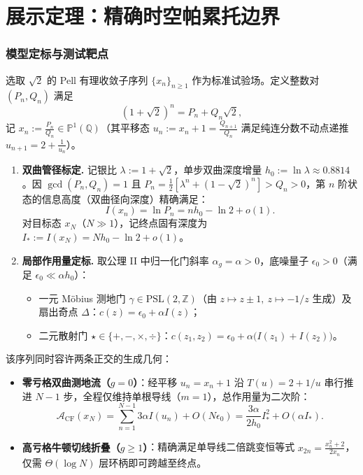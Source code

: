 \documentclass[11pt,a4paper]{ctexart}
\theoremstyle{plain}
\theoremstyle{definition}
\newcommand{\PP}{\mathbb{P}}
\newcommand{\QQ}{\mathbb{Q}}
\newcommand{\ZZ}{\mathbb{Z}}
\newcommand{\cA}{\mathcal{A}}
\newcommand{\PSL}{\mathrm{PSL}}
\begin{document}
\part{展示定理：精确时空帕累托边界}

\section{模型定标与测试靶点}

选取 $\sqrt{2}$ 的 Pell 有理收敛子序列 $\{x_n\}_{n \ge 1}$ 作为标准试验场。定义整数对 $(P_n, Q_n)$ 满足
\[
(1 + \sqrt{2})^n = P_n + Q_n\sqrt{2},
\]
记 $x_n := \frac{P_n}{Q_n} \in \PP^1(\QQ)$（其平移态 $u_n := x_n + 1 = \frac{Q_{n+1}}{Q_n}$ 满足纯连分数不动点递推 $u_{n+1} = 2 + \frac{1}{u_n}$）。

\begin{enumerate}
\item \textbf{双曲管径标定.} 记银比 $\lambda := 1 + \sqrt{2}$，单步双曲深度增量 $h_0 := \ln \lambda \approx 0.8814$。因 $\gcd(P_n, Q_n) = 1$ 且 $P_n = \frac{1}{2}[\lambda^n + (1-\sqrt{2})^n] > Q_n > 0$，第 $n$ 阶状态的信息高度（双曲径向深度）精确满足：
\[
I(x_n) = \ln P_n = n h_0 - \ln 2 + o(1).
\]
对目标态 $x_N$（$N \gg 1$），记终点固有深度为 $I_* := I(x_N) = N h_0 - \ln 2 + o(1)$。

\item \textbf{局部作用量定标.} 取公理 II 中归一化门斜率 $\alpha_g = \alpha > 0$，底噪量子 $\epsilon_0 > 0$（满足 $\epsilon_0 \ll \alpha h_0$）：
\begin{itemize}
\item 一元 Möbius 测地门 $\gamma \in \PSL(2, \ZZ)$（由 $z \mapsto z \pm 1,\ z \mapsto -1/z$ 生成）及扇出奇点 $\Delta$：$c(z) = \epsilon_0 + \alpha I(z)$；
\item 二元散射门 $\star \in \{+, -, \times, \div\}$：$c(z_1, z_2) = \epsilon_0 + \alpha\bigl(I(z_1) + I(z_2)\bigr)$。
\end{itemize}
\end{enumerate}

该序列同时容许两条正交的生成几何：

\begin{itemize}
\item \textbf{零亏格双曲测地流（$g=0$）}：经平移 $u_n = x_n + 1$ 沿 $T(u) = 2 + 1/u$ 串行推进 $N-1$ 步，全程仅维持单根导线（$m=1$），总作用量为二次阶：
\[
\cA_{\mathrm{CF}}(x_N) = \sum_{n=1}^{N-1} 3\alpha I(u_n) + O(N\epsilon_0) = \frac{3\alpha}{2 h_0} I_*^2 + O(\alpha I_*).
\]

\item \textbf{高亏格牛顿切线折叠（$g \ge 1$）}：精确满足单导线二倍跳变恒等式 $x_{2n} = \frac{x_n^2 + 2}{2 x_n}$，仅需 $\Theta(\log N)$ 层环柄即可跨越至终点。
\end{itemize}
\end{document}
